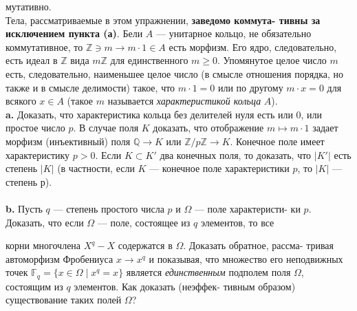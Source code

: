\documentclass{mai_book}
\begin{document}
мутативно.\\
\hspace*{10pt}
Тела, рассматриваемые в этом упражнении, \textbf{заведомо коммута-\linebreak
тивны за исключением пункта (а)}. Бели $A$ — унитарное кольцо,\linebreak
не обязательно коммутативное, то $\mathbb{Z} \ni m\rightarrow m\cdot1\in A$ есть морфизм. Его\linebreak
ядро, следовательно, есть идеал в $\mathbb{Z}$ вида $m\mathbb{Z}$ для единственного $m\geq0$.\linebreak
Упомянутое целое число $m$ есть, следовательно, наименьшее целое число\linebreak
(в смысле отношения порядка, но также и в смысле делимости) такое,\linebreak
что $m\cdot1=0$ или по другому $m\cdot x=0$ для всякого $x\in A$ (такое $m$ \linebreak
называется \textit{характеристикой кольца} $A$).
\\
\hspace*{10pt}\textbf{a.} Доказать, что характеристика кольца без делителей нуля есть\linebreak
или 0, или простое число $p$. В случае поля $K$ доказать, что отображение\linebreak
$m\mapsto m\cdot1$ задает морфизм (инъективный) поля $\mathbb{Q}\rightarrow K$ или $\mathbb{Z}/p\mathbb{Z}\rightarrow K$.\linebreak
Конечное поле имеет характеристику $p > 0$. Если $K\subset K'$ два конечных\linebreak
поля, то доказать, что $|K'|$ есть степень $|K|$ (в частности, если $K$ —\linebreak
конечное поле характеристики $p$, то $|K|$ — степень р).\\
\\
\hspace*{10pt}\textbf{b.} Пусть $q$ — степень простого числа $p$ и $\Omega$ — поле характеристи-\linebreak
ки $p$. Доказать, что если $\Omega$ — поле, состоящее из $q$ элементов, то все\linebreak\pagebreak


\noindent корни многочлена $X^q-X$ содержатся в $\Omega$. Доказать обратное, рассма-\linebreak
тривая автоморфизм Фробениуса $x \rightarrow x^q$ и показывая, что множество\linebreak
его неподвижных точек $\mathbb{F}_q=\{x\in \Omega\;|\;x^q=x\}$ является \textit{единственным}\linebreak
подполем поля $\Omega$, состоящим из $q$ элементов. Как доказать (неэффек-\linebreak
тивным образом) существование таких полей $\Omega$?
\end{document}
